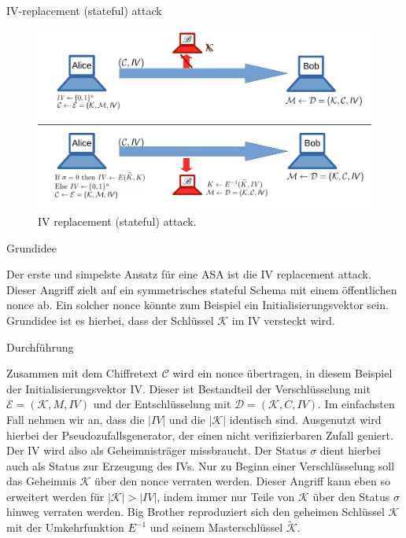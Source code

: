 \begin{section}{IV-replacement (stateful) attack}
\label{sec:iv_replacement_stateful}

\begin{figure}[!ht]
	\centering
	\includegraphics[width=\textwidth]{image/iv_replacement_stateful}
	\caption{IV replacement (stateful) attack.}
	\label{fig:iv_replacement_stateful}
\end{figure}

\begin{subsection}{Grundidee}

Der erste und simpelste Ansatz für eine ASA ist die IV replacement attack. Dieser Angriff zielt auf ein symmetrisches stateful Schema mit einem öffentlichen nonce ab. Ein solcher nonce könnte zum Beispiel ein Initialisierungsvektor sein. Grundidee ist es hierbei, dass der Schlüssel $\mathcal{K}$ im IV versteckt wird.

\end{subsection}

\begin{subsection}{Durchführung}

Zusammen mit dem Chiffretext $\mathcal{C}$ wird ein nonce übertragen, in diesem Beispiel der Initialisierungsvektor IV. Dieser ist Bestandteil der Verschlüsselung mit $\mathcal{E} = (\mathcal{K}, M, IV)$ und der Entschlüsselung mit $\mathcal{D} = (\mathcal{K}, C, IV)$. Im einfachsten Fall nehmen wir an, dass die $|IV|$ und die $|\mathcal{K}|$ identisch sind. Ausgenutzt wird hierbei der Pseudozufallsgenerator, der einen nicht verifizierbaren Zufall geniert. Der IV wird also als Geheimnisträger missbraucht. Der Status $\sigma$ dient hierbei auch als Status zur Erzeugung des IVs. Nur zu Beginn einer Verschlüsselung soll das Geheimnis $\mathcal{K}$ über den nonce verraten werden. Dieser Angriff kann eben so erweitert werden für $|\mathcal{K}| > |IV|$, indem immer nur Teile von $\mathcal{K}$ über den Status $\sigma$  hinweg verraten werden. Big Brother reproduziert sich den geheimen Schlüssel $\mathcal{K}$ mit der Umkehrfunktion $E^{-1}$ und seinem Masterschlüssel $\widetilde{\mathcal{K}}$.


\end{subsection}
\end{section}
